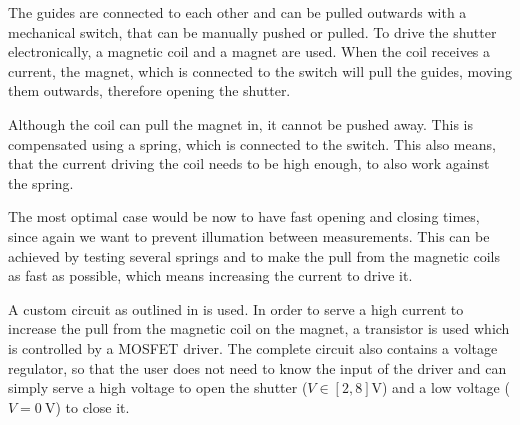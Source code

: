 The guides are connected to each other and can be pulled outwards with a mechanical switch, that can be manually pushed or pulled. To drive the shutter electronically, a magnetic coil and a magnet are used. When the coil receives a current, the magnet, which is connected to the switch will pull the guides, moving them outwards, therefore opening the shutter.

Although the coil can pull the magnet in, it cannot be pushed away. This is compensated using a spring, which is connected to the switch. This also means, that the current driving the coil needs to be high enough, to also work against the spring.

The most optimal case would be now to have fast opening and closing times, since again we want to prevent illumation between measurements. This can be achieved by testing several springs and to make the pull from the magnetic coils as fast as possible, which means increasing the current to drive it.

A custom circuit as outlined in  is used. In order to serve a high current to increase the pull from the magnetic coil on the magnet, a transistor is used which is controlled by a MOSFET driver. The complete circuit also contains a voltage regulator, so that the user does not need to know the input of the driver and can simply serve a high voltage to open the shutter ($V\in\left[2,8\right]\mathrm{V}$) and a low voltage ($V=\SI{0}{\volt}$) to close it.


